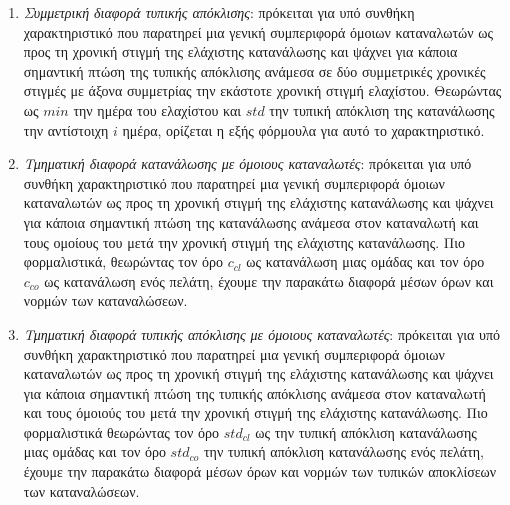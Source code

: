 \begin{enumerate}
\begin{center}
\end{center}
\item{\textit{Συμμετρική διαφορά τυπικής απόκλισης}}: πρόκειται για υπό συνθήκη χαρακτηριστικό που παρατηρεί μια γενική συμπεριφορά όμοιων καταναλωτών ως προς τη χρονική στιγμή της ελάχιστης κατανάλωσης και ψάχνει για κάποια σημαντική πτώση της τυπικής απόκλισης ανάμεσα σε δύο συμμετρικές χρονικές στιγμές με άξονα συμμετρίας την εκάστοτε χρονική στιγμή ελαχίστου. Θεωρώντας ως $min$ την ημέρα του ελαχίστου και $std$ την τυπική απόκλιση της κατανάλωσης την αντίστοιχη $i$ ημέρα, ορίζεται η εξής φόρμουλα για αυτό το χαρακτηριστικό. 
\begin{center}
\end{center}
\item{\textit{Τμηματική διαφορά κατανάλωσης με όμοιους καταναλωτές}}: πρόκειται για υπό συνθήκη χαρακτηριστικό που παρατηρεί μια γενική συμπεριφορά όμοιων καταναλωτών ως προς τη χρονική στιγμή της ελάχιστης κατανάλωσης και ψάχνει για κάποια σημαντική πτώση της κατανάλωσης ανάμεσα στον καταναλωτή και τους ομοίους του μετά την χρονική στιγμή της ελάχιστης κατανάλωσης. Πιο φορμαλιστικά, θεωρώντας τον όρο $c_{cl}$ ως κατανάλωση μιας ομάδας και τον όρο $c_{co}$ ως κατανάλωση ενός πελάτη, έχουμε την παρακάτω διαφορά μέσων όρων και νορμών των καταναλώσεων.
\begin{center}
\end{center}
\item{\textit{Τμηματική διαφορά τυπικής απόκλισης με όμοιους καταναλωτές}}: πρόκειται για υπό συνθήκη χαρακτηριστικό που παρατηρεί μια γενική συμπεριφορά όμοιων καταναλωτών ως προς τη χρονική στιγμή της ελάχιστης κατανάλωσης και ψάχνει για κάποια σημαντική πτώση της τυπικής απόκλισης ανάμεσα στον καταναλωτή και τους όμοιούς του μετά την χρονική στιγμή της ελάχιστης κατανάλωσης. Πιο φορμαλιστικά θεωρώντας τον όρο $std_{cl}$ ως την τυπική απόκλιση κατανάλωσης μιας ομάδας και τον όρο $std_{co}$ την τυπική απόκλιση κατανάλωσης ενός πελάτη, έχουμε την παρακάτω διαφορά μέσων όρων και νορμών των τυπικών αποκλίσεων των καταναλώσεων.

\end{enumerate}
